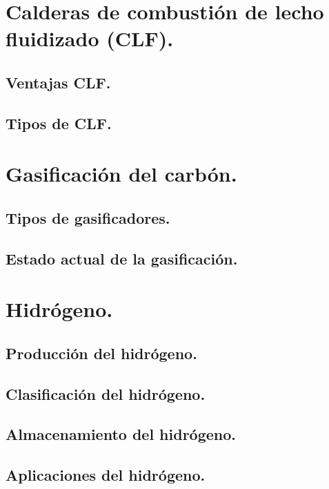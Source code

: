 \section{Calderas de combustión de lecho fluidizado (CLF).}

\subsection{Ventajas CLF.}

\subsection{Tipos de CLF.}

\section{Gasificación del carbón.}

\subsection{Tipos de gasificadores.}

\subsection{Estado actual de la gasificación.}

\section{Hidrógeno.}

\subsection{Producción del hidrógeno.}

\subsection{Clasificación del hidrógeno.}

\subsection{Almacenamiento del hidrógeno.}

\subsection{Aplicaciones del hidrógeno.}

